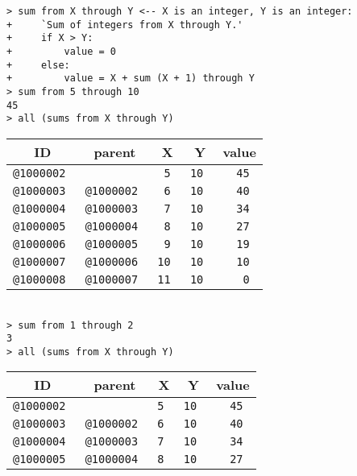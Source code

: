 \documentclass[12pt]{article}
\newenvironment{indpar}[1][0.3in]%
	{\begin{list}{}%
		     {\setlength{\itemsep}{0in}%
		      \setlength{\topsep}{0in}%
		      \setlength{\parsep}{1ex}%
		      \setlength{\labelwidth}{#1}%
		      \setlength{\leftmargin}{#1}%
		      \addtolength{\leftmargin}{\labelsep}}%
	 \item}%
	{\end{list}}
\begin{document}
\begin{indpar}
\verb|> sum from X through Y <-- X is an integer, Y is an integer:| \\
\verb|+     `Sum of integers from X through Y.'| \\
\verb|+     if X > Y:| \\
\verb|+         value = 0| \\
\verb|+     else:| \\
\verb|+         value = X + sum (X + 1) through Y| \\
\verb|> sum from 5 through 10| \\
\verb|45| \\
\verb|> all (sums from X through Y)| \\
\begin{tabular}{|r|r|r|r|r|}
\hline
\multicolumn{1}{|c}{\bf ID} &
\multicolumn{1}{|c}{\bf parent} &
\multicolumn{1}{|c}{\bf X} &
\multicolumn{1}{|c}{\bf Y} &
\multicolumn{1}{|c|}{\bf value} \\
\hline
\tt @1000002 &       		& \tt 5	& \tt	10	& \tt 45 \\
\tt @1000003 & \tt @1000002	& \tt 6	& \tt	10	& \tt 40 \\
\tt @1000004 & \tt @1000003	& \tt 7	& \tt	10	& \tt 34 \\
\tt @1000005 & \tt @1000004	& \tt 8	& \tt	10	& \tt 27 \\
\tt @1000006 & \tt @1000005	& \tt 9	& \tt	10	& \tt 19 \\
\tt @1000007 & \tt @1000006	& \tt 10	& \tt	10	& \tt 10 \\
\tt @1000008 & \tt @1000007	& \tt 11	& \tt	10	& \tt 0 \\
\hline
\end{tabular} \\[0.5ex]
\verb|> sum from 1 through 2| \\
\verb|3| \\
\verb|> all (sums from X through Y)| \\
\begin{tabular}{|r|r|r|r|r|}
\hline
\multicolumn{1}{|c}{\bf ID} &
\multicolumn{1}{|c}{\bf parent} &
\multicolumn{1}{|c}{\bf X} &
\multicolumn{1}{|c}{\bf Y} &
\multicolumn{1}{|c|}{\bf value} \\
\hline
\tt @1000002 &       		& \tt 5		& \tt	10	& \tt 45 \\
\tt @1000003 & \tt @1000002	& \tt 6		& \tt	10	& \tt 40 \\
\tt @1000004 & \tt @1000003	& \tt 7		& \tt	10	& \tt 34 \\
\tt @1000005 & \tt @1000004	& \tt 8		& \tt	10	& \tt 27 \\

\end{tabular}
\end{indpar}
\end{document}
